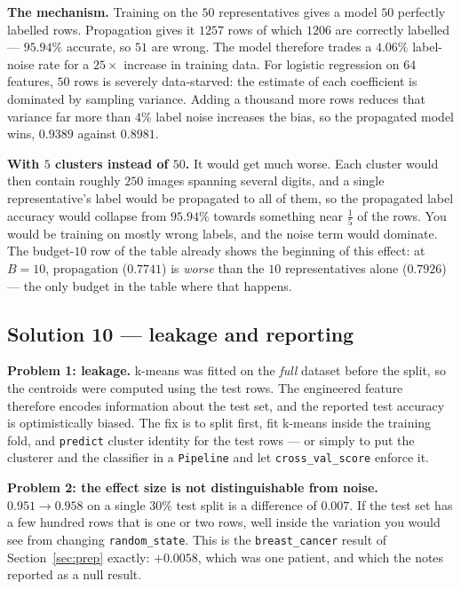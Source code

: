\documentclass[11pt]{article}
\begin{document}
\textbf{The mechanism.} Training on the $50$ representatives gives a model
$50$ perfectly labelled rows. Propagation gives it $1257$ rows of which
$1206$ are correctly labelled --- $95.94\%$ accurate, so $51$ are wrong. The
model therefore trades a $4.06\%$ label-noise rate for a
$25\times$ increase in training data. For logistic regression on $64$
features, $50$ rows is severely data-starved: the estimate of each
coefficient is dominated by sampling variance. Adding a thousand more rows
reduces that variance far more than $4\%$ label noise increases the bias, so
the propagated model wins, $0.9389$ against $0.8981$.

\textbf{With $5$ clusters instead of $50$.} It would get much worse. Each
cluster would then contain roughly $250$ images spanning several digits, and
a single representative's label would be propagated to all of them, so the
propagated label accuracy would collapse from $95.94\%$ towards something
near $\tfrac{1}{5}$ of the rows. You would be training on mostly wrong labels,
and the noise term would dominate. The budget-$10$ row of the table already
shows the beginning of this effect: at $B = 10$, propagation ($0.7741$)
is \emph{worse} than the $10$ representatives alone ($0.7926$) --- the only
budget in the table where that happens.

\subsection*{Solution 10 --- leakage and reporting}

\textbf{Problem 1: leakage.} k-means was fitted on the \emph{full} dataset
before the split, so the centroids were computed using the test rows. The
engineered feature therefore encodes information about the test set, and the
reported test accuracy is optimistically biased. The fix is to split first,
fit k-means inside the training fold, and \texttt{predict} cluster identity
for the test rows --- or simply to put the clusterer and the classifier in a
\texttt{Pipeline} and let \texttt{cross\_val\_score} enforce it.

\textbf{Problem 2: the effect size is not distinguishable from noise.}
$0.951 \to 0.958$ on a single $30\%$ test split is a difference of $0.007$.
If the test set has a few hundred rows that is one or two rows, well inside
the variation you would see from changing \texttt{random\_state}. This is the
\texttt{breast\_cancer} result of Section~\ref{sec:prep} exactly: $+0.0058$,
which was one patient, and which the notes reported as a null result.
\end{document}
